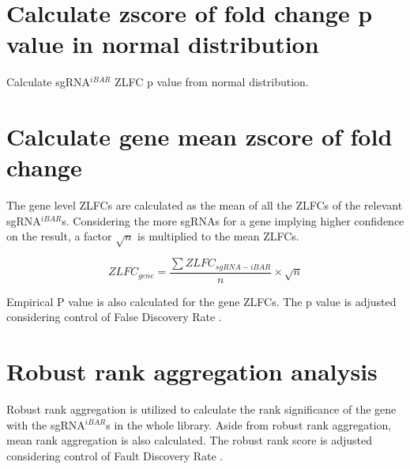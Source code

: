 \documentclass[11pt, a4paper]{article}
\begin{document}






\section{Calculate zscore of fold change p value in normal distribution}

Calculate sgRNA$^{iBAR}$ ZLFC p value from normal distribution.


\section{Calculate gene mean zscore of fold change}

The gene level ZLFCs are calculated as the mean of all the ZLFCs of
the relevant sgRNA$^{iBAR}$s. Considering the more sgRNAs for a gene
implying higher confidence on the result, a factor $\sqrt{n}$ is
multiplied to the mean ZLFCs.

$$ZLFC_{gene} = \frac{\sum{ZLFC_{sgRNA-iBAR}}}{n} \times \sqrt{n}$$

Empirical P value is also calculated for the gene ZLFCs. The p value
is adjusted considering control of False Discovery Rate
\citep{benjamini_controlling_1995}.


\section{Robust rank aggregation analysis}


Robust rank aggregation \citep{kolde_robust_2012} is utilized to
calculate the rank significance of the gene with the sgRNA$^{iBAR}$s
in the whole library. Aside from robust rank aggregation, mean rank
aggregation is also calculated. The robust rank score is adjusted
considering control of Fault Discovery Rate
\citep{benjamini_controlling_1995}.



\end{document}
